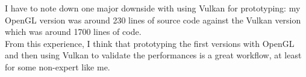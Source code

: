 \documentclass{article}
\begin{document}
I have to note down one major downside with using Vulkan for prototyping: my OpenGL version was around 230 lines of source code against the Vulkan version which was around 1700 lines of code.\\
From this experience, I think that prototyping the first versions with OpenGL and then using Vulkan to validate the performances is a great workflow, at least for some non-expert like me.

\newpage
\listoffigures
\end{document}
